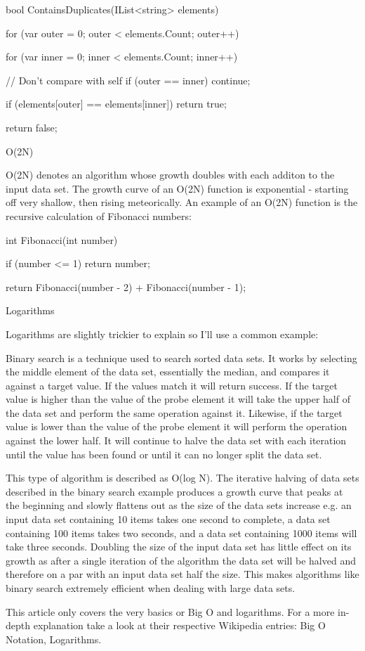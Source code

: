 bool ContainsDuplicates(IList<string> elements)
{
    for (var outer = 0; outer < elements.Count; outer++)
    {
        for (var inner = 0; inner < elements.Count; inner++)
        {
            // Don't compare with self
            if (outer == inner) continue;

            if (elements[outer] == elements[inner]) return true;
        }
    }

    return false;
}
O(2N)

O(2N) denotes an algorithm whose growth doubles with each additon to the input data set. The growth curve of an O(2N) function is exponential - starting off very shallow, then rising meteorically. An example of an O(2N) function is the recursive calculation of Fibonacci numbers:

int Fibonacci(int number)
{
    if (number <= 1) return number;

    return Fibonacci(number - 2) + Fibonacci(number - 1);
}
Logarithms

Logarithms are slightly trickier to explain so I'll use a common example:

Binary search is a technique used to search sorted data sets. It works by selecting the middle element of the data set, essentially the median, and compares it against a target value. If the values match it will return success. If the target value is higher than the value of the probe element it will take the upper half of the data set and perform the same operation against it. Likewise, if the target value is lower than the value of the probe element it will perform the operation against the lower half. It will continue to halve the data set with each iteration until the value has been found or until it can no longer split the data set.

This type of algorithm is described as O(log N). The iterative halving of data sets described in the binary search example produces a growth curve that peaks at the beginning and slowly flattens out as the size of the data sets increase e.g. an input data set containing 10 items takes one second to complete, a data set containing 100 items takes two seconds, and a data set containing 1000 items will take three seconds. Doubling the size of the input data set has little effect on its growth as after a single iteration of the algorithm the data set will be halved and therefore on a par with an input data set half the size. This makes algorithms like binary search extremely efficient when dealing with large data sets.

This article only covers the very basics or Big O and logarithms. For a more in-depth explanation take a look at their respective Wikipedia entries: Big O Notation, Logarithms.
